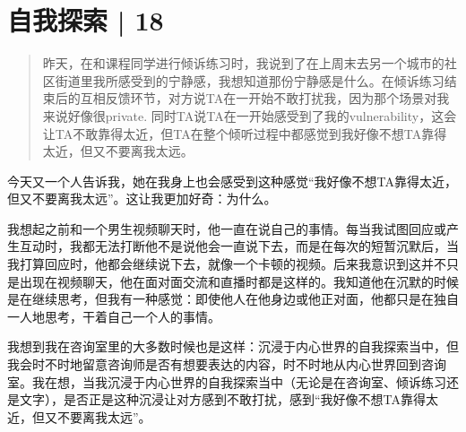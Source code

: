 \chapter{自我探索 | 18}



\blockquote{
昨天，在和课程同学进行倾诉练习时，我说到了在上周末去另一个城市的社区街道里我所感受到的宁静感，我想知道那份宁静感是什么。在倾诉练习结束后的互相反馈环节，对方说TA在一开始不敢打扰我，因为那个场景对我来说好像很private.   同时TA说TA在一开始感受到了我的vulnerability，这会让TA不敢靠得太近，但TA在整个倾听过程中都感觉到我好像不想TA靠得太近，但又不要离我太远。

}

今天又一个人告诉我，她在我身上也会感受到这种感觉\pozhehao{}“我好像不想TA靠得太近，但又不要离我太远”。这让我更加好奇：为什么。

\tristarsepline

我想起之前和一个男生视频聊天时，他一直在说自己的事情。每当我试图回应或产生互动时，我都无法打断他\pozhehao{}不是说他会一直说下去，而是在每次的短暂沉默后，当我打算回应时，他都会继续说下去，就像一个卡顿的视频。后来我意识到这并不只是出现在视频聊天，他在面对面交流和直播时都是这样的。我知道他在沉默的时候是在继续思考，但我有一种感觉：即使他人在他身边或他正对面，他都只是在独自一人地思考，干着自己一个人的事情。

我想到我在咨询室里的大多数时候也是这样：沉浸于内心世界的自我探索当中，但我会时不时地留意咨询师是否有想要表达的内容，时不时地从内心世界回到咨询室。我在想，当我沉浸于内心世界的自我探索当中（无论是在咨询室、倾诉练习还是文字），是否正是这种沉浸让对方感到不敢打扰，感到“我好像不想TA靠得太近，但又不要离我太远”。

